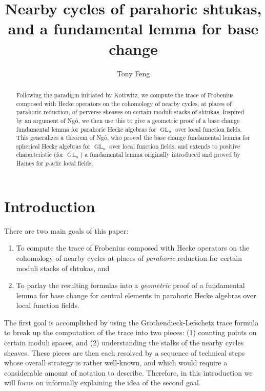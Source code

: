 \documentclass[reqno]{amsart}
\title[Nearby cycles of parahoric shtukas, and a fundamental lemma for base change]{Nearby cycles of parahoric shtukas,\\ and a fundamental lemma for base change}
\author{Tony Feng}
\numberwithin{equation}{section}
\DeclareMathOperator{\GL}{GL}
\theoremstyle{remark}
\numberwithin{equation}{section}
\begin{document}
\begin{abstract}
Following the paradigm initiated by Kottwitz, we compute the trace of Frobenius composed with Hecke operators on the cohomology of nearby cycles, at places of parahoric reduction, of perverse sheaves on certain moduli stacks of shtukas. Inspired by an argument of Ng\^{o}, we then use this to give a geometric proof of a base change fundamental lemma for parahoric Hecke algebras for $\GL_n$ over local function fields. This generalizes a theorem of Ng\^{o}, who proved the base change fundamental lemma for spherical Hecke algebras for $\GL_n$ over local function fields, and extends to positive characteristic (for $\GL_n$) a fundamental lemma originally introduced and proved by Haines for $p$-adic local fields. 
\end{abstract}


\maketitle



\tableofcontents







\section{Introduction}\label{intro}

There are two main goals of this paper: 
\begin{enumerate}
\item To compute the trace of Frobenius composed with Hecke operators on the cohomology of nearby cycles at places of \emph{parahoric} reduction for certain moduli stacks of shtukas, and 
\item To parlay the resulting formulas into a \emph{geometric} proof of a fundamental lemma for base change for central elements in parahoric Hecke algebras over local function fields. 
\end{enumerate} 
The first goal is accomplished by using the Grothendieck-Lefschetz trace formula to break up the computation of the trace into two pieces: (1) counting points on certain moduli spaces, and (2) understanding the stalks of the nearby cycles sheaves. These pieces are then each resolved by a sequence of technical steps whose overall strategy is rather well-known, and which would require a considerable amount of notation to describe. Therefore, in this introduction we will focus on informally explaining the idea of the second goal.
\end{document}
